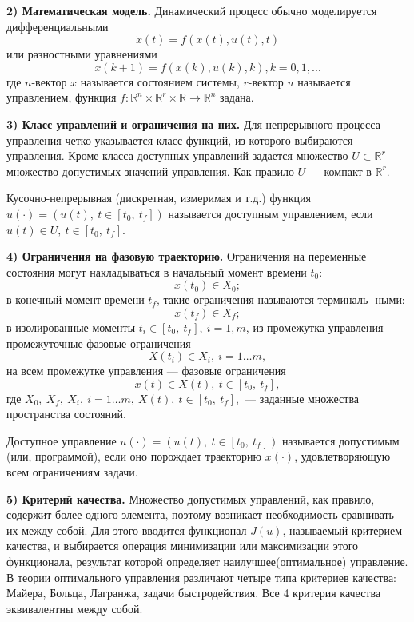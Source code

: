 \textbf{2) Математическая модель.} Динамический процесс обычно моделируется дифференциальными
\[ \dot x(t) = f(x(t), u(t), t) \]
или разностными уравнениями
\[ x(k + 1) = f(x(k), u(k), k), k = 0, 1, ...\]
где $n$-вектор $x$ называется состоянием системы, $r$-вектор $u$ называется управлением, функция $f : \mathbb{R}^n \times \mathbb{R}^r \times \mathbb{R} \to \mathbb{R}^n$ задана.


\textbf{3) Класс управлений и ограничения на них.} Для непрерывного
процесса управления четко указывается класс функций, из которого выбираются управления. Кроме класса доступных управлений задается множество $ U \subset \mathbb{R}^r $ --- множество допустимых значений управления. Как правило $U$ --- компакт в  $\mathbb{R}^r $.


\begin{definition}  Кусочно-непрерывная (дискретная, измеримая
и т.д.) функция $  u(\cdot) = (u(t),~ t \in [t_0,~ t_f])$ называется доступным управлением, если $u(t) \in U,~ t \in [t_0, ~t_f].$
\end{definition}


\textbf{4) Ограничения на фазовую траекторию. } Ограничения на переменные состояния могут накладываться в начальный момент времени $t_0$:
\[x(t_0) \in X_0;\]
в конечный момент времени $t_f$, такие ограничения называются терминаль-
ными:
\[x(t_f) \in X_f;\]
в изолированные моменты $t_i \in [t_0,~ t_f], ~i = 1, m$, из промежутка управления --- промежуточные фазовые ограничения
\[X(t_i) \in X_i, ~i = 1\dots m,\]
на всем промежутке управления --- фазовые ограничения
\[x(t) \in X(t), ~ t \in [t_0,~ t_f],\]
где $X_0,~ X_f,~ X_i, ~i = 1\dots m, ~X(t),~ t \in [t_0,~ t_f],$ --- заданные множества пространства состояний.


\begin{definition}   Доступное управление $  u(\cdot) = (u(t),~ t \in [t_0,~ t_f])$ называется допустимым (или, программой), если оно порождает траекторию $  x(\cdot) $, удовлетворяющую всем ограничениям задачи.
\end{definition}


\textbf{5) Критерий качества. }
Множество допустимых управлений, как правило, содержит более одного элемента, поэтому возникает необходимость сравнивать их между собой. Для этого вводится функционал $ J(u)$, называемый критерием качества, и выбирается операция минимизации или максимизации этого функционала, результат которой определяет наилучшее(оптимальное) управление.
В теории оптимального управления различают четыре типа критериев
качества: Майера, Больца, Лагранжа, задачи быстродействия. Все 4 критерия качества эквивалентны между собой.


